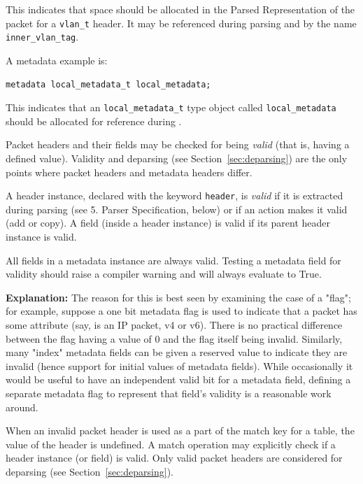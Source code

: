 \documentclass[12pt]{article}
\begin{document}
This indicates that space should be allocated in the Parsed
Representation of the packet for a \texttt{vlan_t} header. It may be
referenced during parsing and \matchaction by the name
\texttt{inner_vlan_tag}.

A metadata example is:

\begin{lstlisting}[keywords={},frame=single,escapechar=\@]
metadata local_metadata_t local_metadata;
\end{lstlisting}

This indicates that an \texttt{local_metadata_t} type object called
\texttt{local_metadata} should be allocated for reference during
\matchaction.


Packet headers and their fields may be checked for being
\textit{valid} (that is, having a defined value). Validity and
deparsing (see Section~\ref{sec:deparsing}) are the only points where packet
headers and metadata headers differ.

A header instance, declared with the keyword \texttt{header}, is
\textit{valid} if it is extracted during parsing (see 5. Parser
Specification, below) or if an action makes it valid (add or copy). A
field (inside a header instance) is valid if its parent header
instance is valid.

All fields in a metadata instance are always valid.  Testing a
metadata field for validity should raise a compiler warning and will
always evaluate to True.

\begin{adjustwidth}{1.5cm}{1.5cm}
\textbf{Explanation: } The reason for this is best seen by examining
the case of a "flag"; for example, suppose a one bit metadata flag is
used to indicate that a packet has some attribute (say, is an IP
packet, v4 or v6).  There is no practical difference between the flag
having a value of 0 and the flag itself being invalid.  Similarly,
many "index" metadata fields can be given a reserved value to indicate
they are invalid (hence support for initial values of metadata
fields).  While occasionally it would be useful to have an independent
valid bit for a metadata field, defining a separate metadata flag to
represent that field's validity is a reasonable work around.
\end{adjustwidth}

When an invalid packet header is used as a part of the match key for a table,
the value of the header is undefined.
A match operation may explicitly check if a header
instance (or field) is valid. Only valid packet headers are considered
for deparsing (see Section~\ref{sec:deparsing}).
\end{document}

